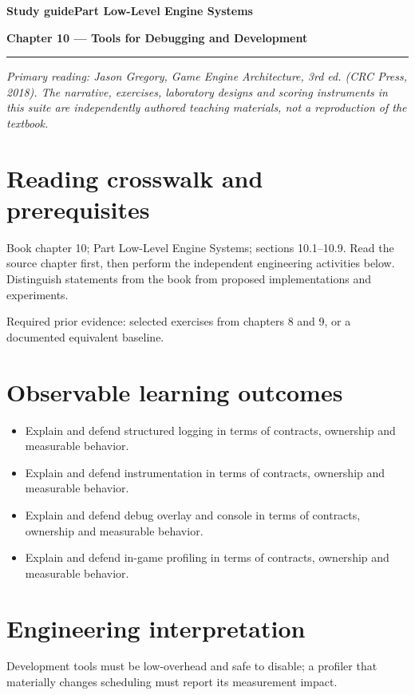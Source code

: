 \documentclass[11pt,letterpaper]{article}
\newcommand{\DocType}{Reference}
\newcommand{\SuiteHeading}[3]{%
\renewcommand{\DocType}{#2}%
{\small\bfseries\sffamily\color{EngineTeal}#2\hfill #3}\par\vspace{6pt}
{\LARGE\bfseries\color{EngineBlue}#1}\par\vspace{4pt}
{\color{EngineTeal}\rule{\linewidth}{1pt}}\par\vspace{7pt}}
\newcommand{\SourceNote}{\footnotesize\textit{Primary reading: Jason Gregory, \emph{Game Engine Architecture}, 3rd ed. (CRC Press, 2018). The narrative, exercises, laboratory designs and scoring instruments in this suite are independently authored teaching materials, not a reproduction of the textbook.}\normalsize\par}
\begin{document}
\SuiteHeading{Chapter 10 — Tools for Debugging and Development}{Study guide}{Part Low-Level Engine Systems}
\SourceNote
\section{Reading crosswalk and prerequisites}
Book chapter 10; Part Low-Level Engine Systems; sections 10.1--10.9. Read the source chapter first, then perform the independent engineering activities below. Distinguish statements from the book from proposed implementations and experiments.

Required prior evidence: selected exercises from chapters 8 and 9, or a documented equivalent baseline.

\section{Observable learning outcomes}
\begin{itemize}
\item Explain and defend structured logging in terms of contracts, ownership and measurable behavior.
\item Explain and defend instrumentation in terms of contracts, ownership and measurable behavior.
\item Explain and defend debug overlay and console in terms of contracts, ownership and measurable behavior.
\item Explain and defend in-game profiling in terms of contracts, ownership and measurable behavior.
\end{itemize}
\section{Engineering interpretation}
Development tools must be low-overhead and safe to disable; a profiler that materially changes scheduling must report its measurement impact.
\end{document}
